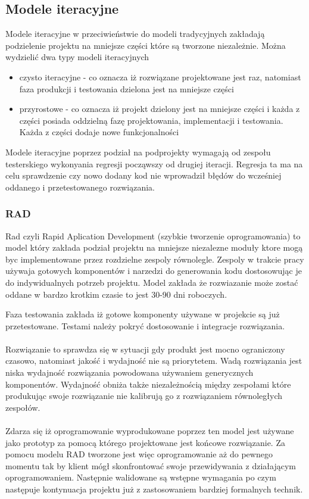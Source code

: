 \subsection{Modele iteracyjne}
Modele iteracyjne w przeciwieństwie do modeli tradycyjnych zakładają podzielenie projektu na mniejsze części które są tworzone niezależnie. Można wydzielić dwa typy modeli iteracyjnych
\begin{itemize}
  \item czysto iteracyjne - co oznacza iż rozwiązane projektowane jest raz, natomiast faza produkcji i testowania dzielona jest na mniejsze części
  \item przyrostowe - co oznacza iż projekt dzielony jest na mniejsze części i każda z części posiada oddzielną fazę projektowania, implementacji i testowania. Każda z części dodaje nowe funkcjonalności
 
\end{itemize}
 Modele iteracyjne poprzez podział na podprojekty wymagają od zespołu testerskiego wykonyania regresji począwszy od drugiej iteracji. Regresja ta ma na celu sprawdzenie czy nowo dodany kod nie wprowadził błędów do wcześniej oddanego i przetestowanego rozwiązania.
\subsubsection{RAD}
Rad czyli Rapid Aplication Development (szybkie tworzenie oprogramowania) to model który zakłada podział projektu na mniejsze
 niezalezne moduły ktore mogą byc implementowane przez rozdzielne zespoly równolegle. Zespoly w trakcie pracy używaja gotowych komponentów i narzedzi do generowania kodu dostosowując je do indywidualnych potrzeb projektu. Model zakłada że rozwiazanie może zostać oddane w bardzo krotkim czasie to jest 30-90 dni roboczych.

Faza testowania zakłada iż gotowe komponenty używane w projekcie są już przetestowane. Testami należy pokryć dostosowanie i integracje rozwiązania. 
\paragraph{}
Rozwiązanie to sprawdza się w sytuacji gdy produkt jest mocno ograniczony czasowo, natomiast jakość i wydajność nie są priorytetem. Wadą rozwiązania jest niska wydajność rozwiązania powodowana używaniem generycznych komponentów. Wydajność obniża także niezależnością między zespołami które produkując swoje rozwiązanie nie kalibrują go z rozwiązaniem równoległych zespołów.
\paragraph{}
Zdarza się iż oprogramowanie wyprodukowane poprzez ten model jest używane jako prototyp za pomocą którego projektowane jest końcowe rozwiązanie. Za pomocu modelu RAD tworzone jest więc oprogramowanie aż do pewnego momentu tak by klient mógł skonfrontować swoje przewidywania z działającym oprogramowaniem. Następnie walidowane są wstępne wymagania po czym następuje kontynuacja projektu już z zastosowaniem bardziej formalnych technik.
